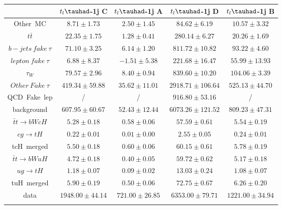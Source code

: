 \centering
\begin{tabular}{ccccc} \toprule\toprule
 & $t_{l}\tauhad$-1j C & $t_{l}\tauhad$-1j A & $t_{l}\tauhad$-1j D & $t_{l}\tauhad$-1j B\\\midrule
\hspace{3mm}Other~MC & $8.71\pm1.73$ & $2.50\pm1.45$ & $84.62\pm6.19$ & $10.57\pm3.32$\\
\hspace{3mm}$t\bar{t}$ & $22.35\pm1.75$ & $1.28\pm0.41$ & $280.14\pm6.27$ & $20.26\pm1.69$\\
\hspace{3mm}$b-jets~fake~\tau$ & $71.10\pm3.25$ & $6.14\pm1.20$ & $811.72\pm10.82$ & $93.22\pm4.60$\\
\hspace{3mm}$lepton~fake~\tau$ & $6.88\pm8.37$ & $-1.51\pm5.38$ & $221.68\pm16.47$ & $55.99\pm13.93$\\
\hspace{3mm}$\tau_{W}$ & $79.57\pm2.96$ & $8.40\pm0.94$ & $839.60\pm10.20$ & $104.06\pm3.39$\\
\hspace{3mm}$Other~Fake~\tau$ & $419.34\pm59.88$ & $35.62\pm11.01$ & $2918.71\pm106.64$ & $525.13\pm44.70$\\
\hspace{3mm}QCD~Fake~lep &  / &  / & $916.80\pm53.16$ &  /\\
background & $607.95\pm60.67$ & $52.43\pm12.44$ & $6073.26\pm121.52$ & $809.23\pm47.31$\\\midrule
\hspace{3mm}$\bar{t}t\to bWcH$ & $5.28\pm0.18$ & $0.58\pm0.06$ & $57.59\pm0.61$ & $5.54\pm0.19$\\
\hspace{3mm}$cg\to tH$ & $0.22\pm0.01$ & $0.01\pm0.00$ & $2.55\pm0.05$ & $0.24\pm0.01$\\
tcH~merged & $5.50\pm0.18$ & $0.60\pm0.06$ & $60.15\pm0.61$ & $5.78\pm0.19$\\
\hspace{3mm}$\bar{t}t\to bWuH$ & $4.72\pm0.18$ & $0.40\pm0.05$ & $59.72\pm0.62$ & $5.17\pm0.18$\\
\hspace{3mm}$ug\to tH$ & $1.18\pm0.07$ & $0.09\pm0.02$ & $13.03\pm0.24$ & $1.08\pm0.07$\\
tuH~merged & $5.90\pm0.19$ & $0.50\pm0.06$ & $72.75\pm0.67$ & $6.26\pm0.20$\\ \midrule
data & $1948.00\pm44.14$ & $721.00\pm26.85$ & $6353.00\pm79.71$ & $1221.00\pm34.94$\\
\bottomrule\bottomrule\\
\end{tabular}
